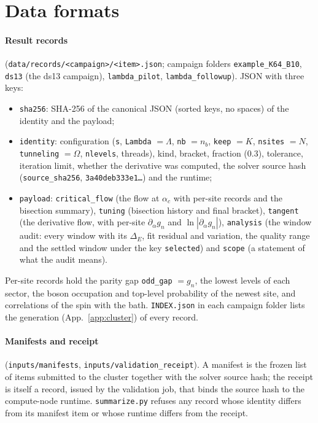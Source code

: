 \documentclass[10pt,a4paper]{article}
\newcommand{\DE}{\Delta_E}
\newcommand{\code}[1]{\texttt{#1}}
\begin{document}
\appendix
\section{Data formats}\label{app:formats}
\paragraph{Result records} (\code{data/records/<campaign>/<item>.json}; campaign folders \code{example\_K64\_B10}, \code{ds13} (the
ds13 campaign), \code{lambda\_pilot}, \code{lambda\_followup}). JSON with three keys:
\begin{itemize}
\item \code{sha256}: SHA-256 of the canonical JSON (sorted keys, no spaces) of the identity and the payload;
\item \code{identity}: configuration (\code{s}, \code{Lambda} $=\Lambda$, \code{nb} $=n_b$, \code{keep} $=K$, \code{nsites} $=N$,
  \code{tunneling} $=\Omega$, \code{nlevels}, threads), kind, bracket, fraction (0.3), tolerance, iteration limit, whether the
  derivative was computed, the solver source hash (\code{source\_sha256}, \code{3a40deb333e1\ldots}) and the runtime;
\item \code{payload}: \code{critical\_flow} (the flow at $\alpha_c$ with per-site records and the bisection summary), \code{tuning}
  (bisection history and final bracket), \code{tangent} (the derivative flow, with per-site $\partial_\alpha g_n$ and
  $\ln|\partial_\alpha g_n|$), \code{analysis} (the window audit: every window with its $\DE$, fit residual and variation, the quality
  range and the settled window under the key \code{selected}) and \code{scope} (a statement of what the audit means).
\end{itemize}
Per-site records hold the parity gap \code{odd\_gap} $=g_n$, the lowest levels of each sector, the boson occupation and top-level
probability of the newest site, and correlations of the spin with the bath. \code{INDEX.json} in each campaign folder lists the
generation (App.~\ref{app:cluster}) of every record.

\paragraph{Manifests and receipt} (\code{inputs/manifests}, \code{inputs/validation\_receipt}). A manifest is the frozen list of items
submitted to the cluster together with the solver source hash; the receipt is itself a record, issued by the validation job, that
binds the source hash to the compute-node runtime. \code{summarize.py} refuses any record whose identity differs from its manifest
item or whose runtime differs from the receipt.
\end{document}
